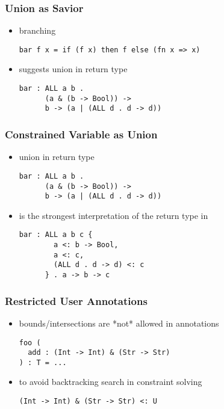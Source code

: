 \documentclass{beamer}
\begin{document}
\begin{frame}[fragile]
  \frametitle{Union as Savior}

  \begin{itemize}
  \item branching  
  \begin{lstlisting}
bar f x = if (f x) then f else (fn x => x)
  \end{lstlisting}

  \item suggests union in return type 
  \begin{lstlisting}
bar : ALL a b . 
      (a & (b -> Bool)) -> 
      b -> (a | (ALL d . d -> d))
  \end{lstlisting}
  \end{itemize}
\end{frame}


\begin{frame}[fragile]
  \frametitle{Constrained Variable as Union}

  \begin{itemize}
  \item union in return type 
  \begin{lstlisting}
bar : ALL a b . 
      (a & (b -> Bool)) -> 
      b -> (a | (ALL d . d -> d))
  \end{lstlisting}
  \item is the strongest interpretation of the return type in 
  \begin{lstlisting}
bar : ALL a b c {
        a <: b -> Bool, 
        a <: c, 
        (ALL d . d -> d) <: c
      } . a -> b -> c
  \end{lstlisting}
  \end{itemize}
\end{frame}


\begin{frame}[fragile]
  \frametitle{Restricted User Annotations}

  \begin{itemize}
  \item bounds/intersections are *not* allowed in annotations 
  \begin{lstlisting}
foo (
  add : (Int -> Int) & (Str -> Str)
) : T = ...
  \end{lstlisting}
  \item to avoid backtracking search in constraint solving 
  \begin{lstlisting}
(Int -> Int) & (Str -> Str) <: U
  \end{lstlisting}
  \end{itemize}
\end{frame}
\end{document}
